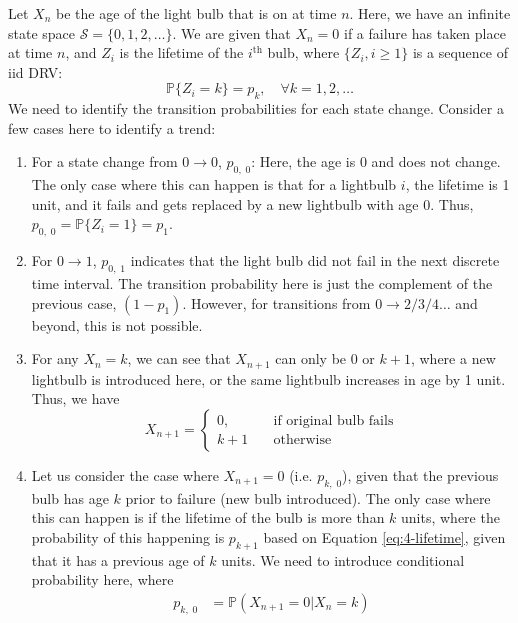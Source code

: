 \documentclass[12pt]{article}
\begin{document}
Let $X_n$ be the age of the light bulb that is on at time $n$. Here, we have an infinite state space $\mathcal{S} = \{0, 1, 2, \dots\}$. We are given that $X_n = 0$ if a failure has taken place at time $n$, and $Z_i$ is the lifetime of the $i^{\text{th}}$ bulb, where $\{Z_i, i\geq 1\}$ is a sequence of iid DRV: \begin{equation}\label{eq:4-lifetime}
    \mathbb{P}\{Z_i = k\} = p_k, \quad \forall k = 1, 2, \dots
\end{equation} We need to identify the transition probabilities for each state change. Consider a few cases here to identify a trend: \begin{enumerate}
    \item For a state change from $0 \to 0$, $p_{0, \; 0}$: Here, the age is 0 and does not change. The only case where this can happen is that for a lightbulb $i$, the lifetime is 1 unit, and it fails and gets replaced by a new lightbulb with age 0. Thus, $p_{0, \; 0} = \mathbb{P}\{Z_i = 1\} = p_{1}$. 
    \item For $0 \to 1$, $p_{0, \; 1}$ indicates that the light bulb did not fail in the next discrete time interval. The transition probability here is just the complement of the previous case, $(1 - p_{1})$. However, for transitions from $0 \to 2 / 3 / 4 \dots$ and beyond, this is not possible. 
    \item For any $X_n = k$, we can see that $X_{n+1}$ can only be $0$ or $k + 1$, where a new lightbulb is introduced here, or the same lightbulb increases in age by 1 unit. Thus, we have \begin{equation}\label{eq:4-xn+1}
        X_{n+1} = \begin{cases}
            0, \quad & \text{if original bulb fails} \\ 
            k + 1 \quad & \text{otherwise}
        \end{cases}
    \end{equation}
    \item Let us consider the case where $X_{n+1} = 0$ (i.e. $p_{k, \; 0}$), given that the previous bulb has age $k$ prior to failure (new bulb introduced). The only case where this can happen is if the lifetime of the bulb is more than $k$ units, where the probability of this happening is $p_{k+1}$ based on Equation \ref{eq:4-lifetime}, given that it has a previous age of $k$ units. We need to introduce conditional probability here, where \begin{align*}
        p_{k, \; 0} &= \mathbb{P}(X_{n+1} = 0 \vert X_n = k) \\ 

\end{align*}
\end{enumerate}
\end{document}
